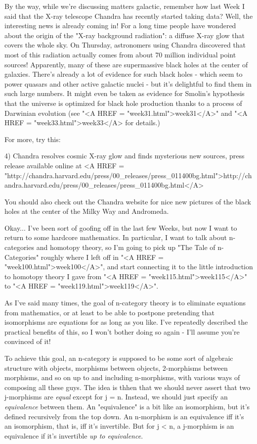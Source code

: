 By the way, while we're discussing matters galactic, remember how last
Week I said that the X-ray telescope Chandra has recently started taking
data?  Well, the interesting news is already coming in!  For a long time
people have wondered about the origin of the "X-ray background radiation":   
a diffuse X-ray glow that covers the whole sky.  On Thursday, astronomers 
using Chandra discovered that most of this radiation actually comes from 
about 70 million individual point sources!   Apparently, many of these are 
supermassive black holes at the center of galaxies.  There's already a 
lot of evidence for such black holes - which seem to power quasars and
other active galactic nuclei - but it's delightful to find them in such 
large numbers.  It might even be taken as evidence for Smolin's hypothesis  
that the universe is optimized for black hole production thanks to a 
process of Darwinian evolution (see "<A HREF = "week31.html">week31</A>" and "<A HREF = "week33.html">week33</A> for details.)

For more, try this:

4) Chandra resolves cosmic X-ray glow and finds mysterious new 
sources, press release available online at
<A HREF = "http://chandra.harvard.edu/press/00_releases/press_011400bg.html">http://chandra.harvard.edu/press/00_releases/press_011400bg.html</A>

You should also check out the Chandra website for nice new pictures
of the black holes at the center of the Milky Way and Andromeda.
 
Okay... I've been sort of goofing off in the last few Weeks, but now I
want to return to some hardcore mathematics.  In particular, I want to
talk about n-categories and homotopy theory, so I'm going to pick up
"The Tale of n-Categories" roughly where I left off in
"<A HREF = "week100.html">week100</A>", and start connecting
it to the little introduction to homotopy theory I gave from "<A
HREF = "week115.html">week115</A>" to "<A HREF =
"week119.html">week119</A>".
  
As I've said many times, the goal of n-category theory is to eliminate
equations from mathematics, or at least to be able to postpone
pretending that isomorphisms are equations for as long as you like.
I've repeatedly described the practical benefits of this, so I won't
bother doing so again - I'll assume you're convinced of it!

To achieve this goal, an n-category is supposed to be some sort of
algebraic structure with objects, morphisms between objects, 2-morphisms
between morphisms, and so on up to and including n-morphisms, with
various ways of composing all these guys.  The idea is thhen that we
should never assert that two j-morphisms are \emph{equal} except for j = n.
Instead, we should just specify an \emph{equivalence} between them.  An
"equivalence" is a bit like an isomorphism, but it's defined
recursively from the top down.  An n-morphism is an equivalence iff it's
an isomorphism, that is, iff it's invertible.  But for j < n, a
j-morphism is an equivalence if it's invertible \emph{up to equivalence}.

